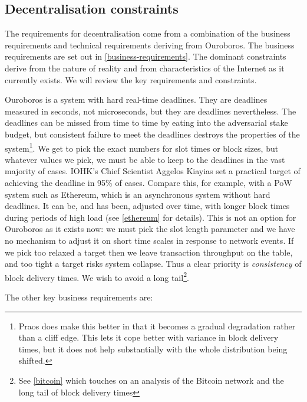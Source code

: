 \documentclass[11pt,a4paper]{article}
\begin{document}
\subsection{Decentralisation constraints}
\label{decentralisation-constraints}

The requirements for decentralisation come from a combination of the
business requirements and technical requirements deriving from
Ouroboros. The business requirements are set out in
\cref{business-requirements}. The dominant
constraints derive from the nature of reality and from characteristics
of the Internet as it currently exists. We will review the key
requirements and constraints.

Ouroboros is a system with hard real-time deadlines. They are deadlines
measured in seconds, not microseconds, but they are deadlines
nevertheless. The deadlines can be missed from time to time by eating
into the adversarial stake budget, but consistent failure to meet the
deadlines destroys the properties of the system\footnote{Praos does make
  this better in that it becomes a gradual degradation rather than a
  cliff edge. This lets it cope better with variance in block delivery
  times, but it does not help substantially with the whole distribution
  being shifted.}. We get to pick the exact numbers for slot times or
block sizes, but whatever values we pick, we must be able to keep to the
deadlines in the vast majority of cases. IOHK's Chief Scientist Aggelos
Kiayias set a practical target of achieving the deadline in 95\% of
cases. Compare this, for example, with a PoW system such as Ethereum,
which is an asynchronous system without hard deadlines. It can be, and
has been, adjusted over time, with longer block times during periods of
high load (see \cref{ethereum} for
details). This is not an option for Ouroboros as it exists now: we must
pick the slot length parameter and we have no mechanism to adjust it on
short time scales in response to network events. If we pick too relaxed
a target then we leave transaction throughput on the table, and too
tight a target risks system collapse. Thus a clear priority is
\emph{consistency} of block delivery times. We wish to avoid a long
tail\footnote{See \cref{bitcoin} which
  touches on an analysis of the Bitcoin network and the long tail of
  block delivery times}.

The other key business requirements are:
\end{document}
